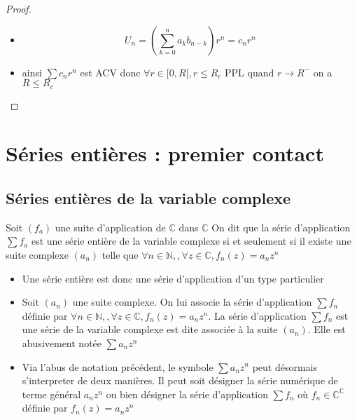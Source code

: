 \documentclass[11pt,hidelinks]{book}
\theoremstyle{mytheoremstyle}
\theoremstyle{mytheoremstyle}
\theoremstyle{mytheoremstyle}
\theoremstyle{mytheoremstyle}
\theoremstyle{mytheoremstyle}
\theoremstyle{mytheoremstyle}
\theoremstyle{mytheoremstyle}
\theoremstyle{mytheoremstyle}
\theoremstyle{myproblemstyle}
\def\mbb#1{\mathbb{#1}}
\def\bN{\mbb{N}}
\def\bC{\mbb{C}}
\def\fn{\forall n \in \bN,}
\newcommand{\parenth}[1]{\left(#1\right)}
\begin{document}
\begin{adjustwidth}{-2em}{-1em}
\begin{prop}
\begin{proof}
\begin{itemize}[label=$\cdot$]
            \item \begin{equation*} 
                U_n = \parenth{\sum_{k=0}^n a_k b_{n-k}} r^n = c_n r^n
            \end{equation*}
            \item ainsi $\sum c_n r^n$ est ACV
            donc $\forall r \in [0,R[, r \leq R_c$ PPL quand $r \to R^-$ on a $R \leq R_c$ 
        \end{itemize}
        \end{proof}
    \end{prop}
    \newpage
\end{adjustwidth}
\chapter{Séries entières : premier contact}
\section{Séries entières de la variable complexe}
\begin{definition}
    Soit $(f_a)$ une suite d'application de $\bC$ dans $\bC$ 
    On dit que la série d'application $\sum f_a$ est une série 
    entière de la variable complexe si et seulement si il existe une suite 
    complexe $(a_n)$ telle que $\fn, \forall z \in \bC, f_n(z) = a_n z^n$
\end{definition}
\begin{rmq}
    \begin{itemize}
        \item Une série entière est donc une série d'application d'un type particulier 
        \item Soit $(a_n)$ une suite complexe. On lui associe la série d'application $\sum f_n$ 
        définie par $\fn, \forall z \in \bC, f_n(z) = a_n z^n$. La série 
        d'application $\sum f_n$ est une série de la variable complexe est 
        dite associée à la suite $(a_n)$. Elle est abusivement notée $\sum a_n z^n$
        \item Via l'abus de notation précédent, le symbole $\sum a_n z^n$ peut désormais 
        s'interpreter de deux manières. Il peut soit désigner la série numérique 
        de terme général $a_n z^n$ ou bien désigner la série d'application $\sum f_n$ où 
        $f_n \in \bC^{\bC}$ définie par $f_n(z) = a_n z^n$
    \end{itemize}
\end{rmq}
\end{document}
